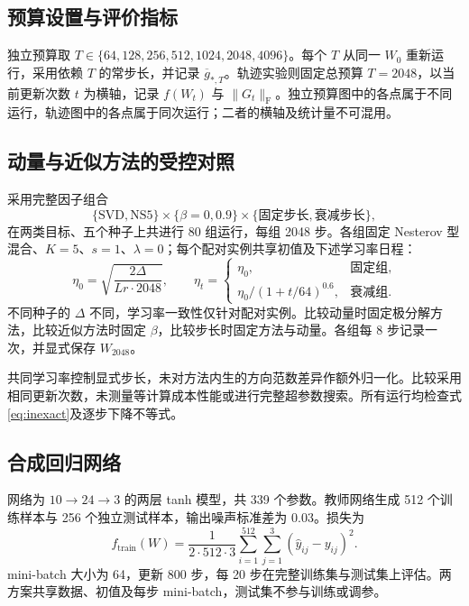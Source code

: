 \documentclass[11pt,a4paper]{article}
\theoremstyle{definition}
\newcommand{\F}{\mathrm{F}}
\newcommand{\avggrad}{\overline{g}_{*,T}}
\begin{document}
\subsection{预算设置与评价指标}
独立预算取 $T\in\{64,128,256,512,1024,2048,4096\}$。每个 $T$ 从同一 $W_0$ 重新运行，采用依赖 $T$ 的常步长，并记录 $\avggrad$。轨迹实验则固定总预算 $T=2048$，以当前更新次数 $t$ 为横轴，记录 $f(W_t)$ 与 $\|G_t\|_\F$。独立预算图中的各点属于不同运行，轨迹图中的各点属于同次运行；二者的横轴及统计量不可混用。

\subsection{动量与近似方法的受控对照}
采用完整因子组合
\[
 \{\mathrm{SVD},\mathrm{NS5}\}\times\{\beta=0,0.9\}
 \times\{\text{固定步长},\text{衰减步长}\},
\]
在两类目标、五个种子上共进行 80 组运行，每组 2048 步。各组固定 Nesterov 型混合、$K=5$、$s=1$、$\lambda=0$；每个配对实例共享初值及下述学习率日程：
\begin{equation}
 \eta_0=\sqrt{\frac{2\Delta}{Lr\cdot2048}},\qquad
 \eta_t=\begin{cases}\eta_0,&\text{固定组},\\
 \eta_0/(1+t/64)^{0.6},&\text{衰减组}.
 \end{cases}
 \label{eq:controlled-lr}
\end{equation}
不同种子的 $\Delta$ 不同，学习率一致性仅针对配对实例。比较动量时固定极分解方法，比较近似方法时固定 $\beta$，比较步长时固定方法与动量。各组每 8 步记录一次，并显式保存 $W_{2048}$。

共同学习率控制显式步长，未对方法内生的方向范数差异作额外归一化。比较采用相同更新次数，未测量等计算成本性能或进行完整超参数搜索。所有运行均检查式\eqref{eq:inexact}及逐步下降不等式。

\subsection{合成回归网络}
网络为 $10\to24\to3$ 的两层 tanh 模型，共 339 个参数。教师网络生成 512 个训练样本与 256 个独立测试样本，输出噪声标准差为 0.03。损失为
\[
 f_{\mathrm{train}}(W)=\frac1{2\cdot512\cdot3}
 \sum_{i=1}^{512}\sum_{j=1}^3(\widehat y_{ij}-y_{ij})^2.
\]
mini-batch 大小为 64，更新 800 步，每 20 步在完整训练集与测试集上评估。两方案共享数据、初值及每步 mini-batch，测试集不参与训练或调参。
\end{document}
